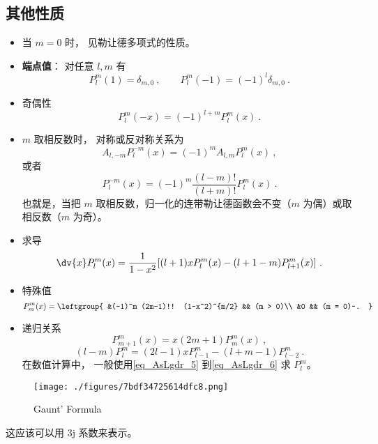 \subsection{其他性质}
\begin{itemize}
\item 当 $m = 0$ 时， 见勒让德多项式的性质。

\item \textbf{端点值}： 对任意 $l, m$ 有
\begin{equation}\label{eq_AsLgdr_2}
P_l^m(1) = \delta_{m, 0}~,
\qquad
P_l^m(-1) = (-1)^l \delta_{m, 0}~.
\end{equation}
\item 奇偶性
\begin{equation}
P_l^m(-x) = (-1)^{l+m}P_l^m(x)~.
\end{equation}
\item $m$ 取相反数时， 对称或反对称关系为
\begin{equation}
A_{l,-m} P_l^{-m}(x) = (-1)^m A_{l,m} P_l^m(x)~,
\end{equation}
或者
\begin{equation}
P_l^{-m}(x) = (-1)^m \frac{(l-m)!}{(l+m)!} P_l^m(x)~.
\end{equation}
也就是，当把 $m$ 取相反数，归一化的连带勒让德函数会不变（$m$ 为偶）或取相反数（$m$ 为奇）。
\item 求导
\begin{equation}
\dv{x} P_l^m(x) = \frac{1}{1-x^2} [(l+1)xP_l^m(x) - (l+1-m)P_{l+1}^m(x)]~.
\end{equation}
\item 特殊值
\begin{equation}\label{eq_AsLgdr_5} %
P_m^m(x) = \leftgroup{
&(-1)^m (2m-1)!! (1-x^2)^{m/2} && (m > 0)\\
&0 && (m = 0)~.
}\end{equation}
\item 递归关系
\begin{equation} %
P_{m+1}^m(x) = x (2m + 1) P_m^m(x)~,
\end{equation}
\begin{equation}\label{eq_AsLgdr_6} %
(l-m) P_l^m = (2l-1) x P_{l-1}^m - (l+m-1) P_{l-2}^m~.
\end{equation}
在数值计算中， 一般使用\autoref{eq_AsLgdr_5} 到\autoref{eq_AsLgdr_6} 求 $P_l^m$。
\end{itemize}


\begin{figure}[ht]
\centering
\texttt{[image: ./figures/7bdf34725614dfc8.png]}
\caption{Gaunt' Formula} \label{fig_AsLgdr_1}
\end{figure}
这应该可以用 3j 系数来表示。
